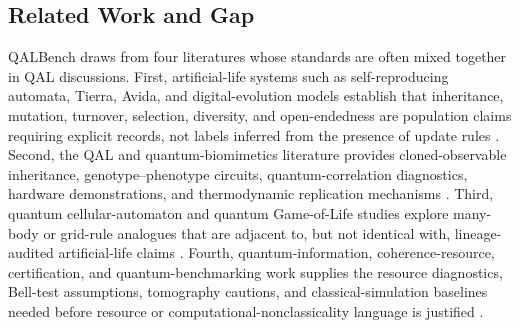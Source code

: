 \documentclass[11pt]{article}
\begin{document}
\subsection{Related Work and Gap}

QALBench draws from four literatures whose standards are often mixed together in QAL discussions. First, artificial-life systems such as self-reproducing automata, Tierra, Avida, and digital-evolution models establish that inheritance, mutation, turnover, selection, diversity, and open-endedness are population claims requiring explicit records, not labels inferred from the presence of update rules \citep{vonneumann1966self,ray1992tierra,ofria2004avida,lenski2003evolutionary,bedau2003artificial,bullock2006exploring,banzhaf2016defining,packard2019overview,dolson2019modes}. Second, the QAL and quantum-biomimetics literature provides cloned-observable inheritance, genotype--phenotype circuits, quantum-correlation diagnostics, hardware demonstrations, and thermodynamic replication mechanisms \citep{alvarez2014biomimetic,alvarez2016artificial,alvarez2018ibm,lamata2020perspective,valente2021self}. Third, quantum cellular-automaton and quantum Game-of-Life studies explore many-body or grid-rule analogues that are adjacent to, but not identical with, lineage-audited artificial-life claims \citep{bleh2012quantum,ney2022entanglement,escanez2026qgol}. Fourth, quantum-information, coherence-resource, certification, and quantum-benchmarking work supplies the resource diagnostics, Bell-test assumptions, tomography cautions, and classical-simulation baselines needed before resource or computational-nonclassicality language is justified \citep{bell1964einstein,clauser1969proposed,baumgratz2014coherence,horodecki1995violating,guhne2009entanglement,brunner2014bell,li2020qasmbench,tomesh2022supermarq,gottesman1998heisenberg,aaronson2004improved,vidal2003efficient,bravyi2005universal,veitch2012negative,howard2014contextuality,pashayan2015estimating,bravyi2016improved,huang2020classical}.
\end{document}
